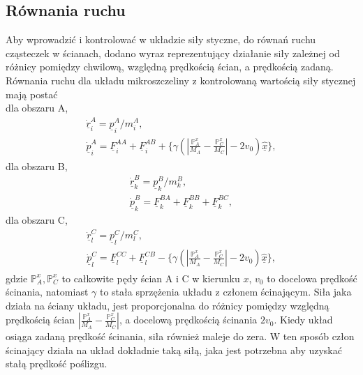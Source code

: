 \documentclass[12pt,a4paper,openright]{report} %
\begin{document}
\subsection{Równania ruchu}
\label{rownania_ruchu_scinania}
%
Aby wprowadzić i kontrolować w układzie siły styczne, do równań ruchu cząsteczek w ścianach, dodano wyraz reprezentujący działanie siły zależnej od różnicy pomiędzy chwilową, względną prędkością ścian, a prędkością zadaną. Równania ruchu dla układu mikroszczeliny z kontrolowaną wartością siły stycznej mają postać\\
dla obszaru A,
%
\begin{equation}
\begin{gathered}
\underline{\dot{r}}^A_i=\underline{p}^A_i/m_i^A,
%
\\
%
\underline{\dot{p}}^A_i=\underline{F}^{AA}_i +
\underline{F}^{AB}_i  +
\underset{\text{}}{\Bigg\{ \gamma \left( \left| \frac{\mathbb{P}^x_A}{M_A} - \frac{\mathbb{P}^x_C}{M_C} \right| - 2v_0 \right) \hat{\underline{x}} \Bigg\}},
\label{eq:sh2}
\end{gathered}
\end{equation}
%
dla obszaru B,
%
\begin{equation}
\begin{gathered}
\underline{\dot{r}}^B_k=\underline{p}^B_k/m_k^B,
\\
\underline{\dot{p}}^B_k=\underline{F}^{BA}_k +
\underline{F}^{BB}_k + \underline{F}^{BC}_k,
\label{eq:sh4}
\end{gathered}
\end{equation}
%
dla obszaru C,
%
\begin{equation}
\begin{gathered}
\underline{\dot{r}}^C_l=\underline{p}^C_l/m_l^C,
\\
\underline{\dot{p}}^C_l=\underline{F}^{CC}_l +
\underline{F}^{CB}_l -
\underset{\text{}}{\Bigg\{ \gamma \left( \left| \frac{\mathbb{P}^x_A}{M_A} - \frac{\mathbb{P}^x_C}{M_C} \right| - 2v_0 \right) \hat{\underline{x}} \Bigg\}},
\label{eq:sh6}
\end{gathered}
\end{equation}
%
gdzie $\mathbb{P}^x_A, \mathbb{P}^x_C$ to całkowite pędy ścian A i C w kierunku $x$, $v_0$ to docelowa prędkość ścinania, natomiast $\gamma$ to stała sprzężenia układu z członem ścinającym. Siła jaka działa na ściany układu, jest proporcjonalna do różnicy pomiędzy względną prędkością ścian $\left| \frac{\mathbb{P}^x_A}{M_A} - \frac{\mathbb{P}^x_C}{M_C} \right|$, a docelową prędkością ścinania $2 v_0$. Kiedy układ osiąga zadaną prędkość ścinania, siła również maleje do zera. W ten sposób człon ścinający działa na układ dokładnie taką siłą, jaka jest potrzebna aby uzyskać stałą prędkość poślizgu.
\end{document}
